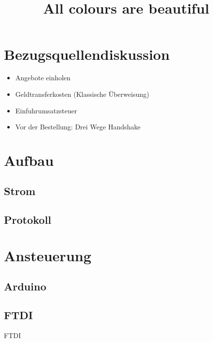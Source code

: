 \documentclass{beamer}
\title{All colours are beautiful}
\institute{MetaMeute}
\begin{document}
\begin{frame}
 \maketitle
\end{frame}

\section{Bezugsquellendiskussion}
\begin{frame}
\begin{itemize}
 \item Angebote einholen
 \item Geldtransferkosten (Klassische Überweisung)
 \item Einfuhrumsatzsteuer
 \item Vor der Bestellung: Drei Wege Handshake
\end{itemize}
\end{frame}

\section{Aufbau}
\subsection{Strom}
\begin{frame}
\end{frame}

\subsection{Protokoll}
\begin{frame}
\end{frame}

\section{Ansteuerung}
\subsection{Arduino}
\begin{frame}
\end{frame}

\subsection{FTDI}
\begin{frame}{FTDI}
\end{frame}
\end{document}
